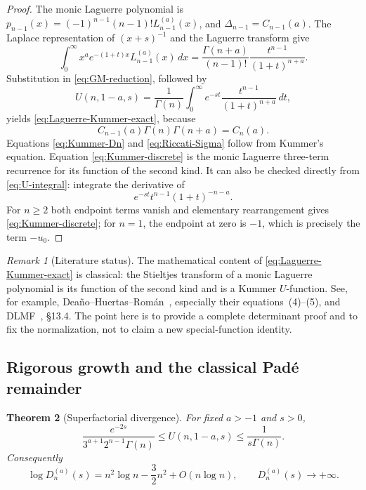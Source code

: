 \documentclass[11pt]{article}
\newtheorem{theorem}{Theorem}[section]
\theoremstyle{definition}
\theoremstyle{remark}
\newtheorem{remark}[theorem]{Remark}
\begin{document}
\begin{proof}
The monic Laguerre polynomial is
\(p_{n-1}(x)=(-1)^{n-1}(n-1)!L_{n-1}^{(a)}(x)\), and
\(\Delta_{n-1}=C_{n-1}(a)\).  The Laplace representation of
\((x+s)^{-1}\) and the Laguerre transform give
\begin{equation}
 \int_0^\infty x^ae^{-(1+t)x}L_{n-1}^{(a)}(x)\,dx
 =\frac{\Gamma(n+a)}{(n-1)!}
   \frac{t^{n-1}}{(1+t)^{n+a}}.
 \label{eq:Laguerre-Laplace}
\end{equation}
Substitution in \eqref{eq:GM-reduction}, followed by
\begin{equation}
 U(n,1-a,s)=\frac1{\Gamma(n)}\int_0^\infty
 e^{-st}\frac{t^{n-1}}{(1+t)^{n+a}}\,dt,
 \label{eq:U-integral}
\end{equation}
yields \eqref{eq:Laguerre-Kummer-exact}, because
\[
 C_{n-1}(a)\Gamma(n)\Gamma(n+a)=C_n(a).
\]
Equations \eqref{eq:Kummer-Dn} and \eqref{eq:Riccati-Sigma} follow from
Kummer's equation.  Equation \eqref{eq:Kummer-discrete} is the monic
Laguerre three-term recurrence for its function of the second kind.  It can
also be checked directly from \eqref{eq:U-integral}: integrate the derivative
of
\[
 e^{-st}t^{n-1}(1+t)^{-n-a}.
\]
For \(n\geq2\) both endpoint terms vanish and elementary rearrangement gives
\eqref{eq:Kummer-discrete}; for \(n=1\), the endpoint at zero is \(-1\), which
is precisely the term \(-u_0\).
\end{proof}

\begin{remark}[Literature status]
The mathematical content of \eqref{eq:Laguerre-Kummer-exact} is classical:
the Stieltjes transform of a monic Laguerre polynomial is its function of the
second kind and is a Kummer \(U\)-function.  See, for example,
Dea\~no--Huertas--Rom\'an~\cite{DeanoHuertasRoman2018}, especially their
equations~(4)--(5), and DLMF~\cite{DLMF}, \S13.4.  The point here is to provide
a complete determinant proof and to fix the normalization, not to claim a new
special-function identity.
\end{remark}

\subsection{Rigorous growth and the classical Pad\'e remainder}

\begin{theorem}[Superfactorial divergence]
\label{thm:Laguerre-divergence}
For fixed \(a>-1\) and \(s>0\),
\begin{equation}
 \frac{e^{-2s}}{3^{a+1}2^{n-1}\Gamma(n)}
 \leq U(n,1-a,s)\leq\frac1{s\Gamma(n)}.
 \label{eq:U-bounds}
\end{equation}
Consequently
\begin{equation}
 \boxed{
 \log D_n^{(a)}(s)=n^2\log n-\frac32n^2+O(n\log n),}
 \qquad
 D_n^{(a)}(s)\longrightarrow+\infty.
 \label{eq:Dn-growth}
\end{equation}
\end{theorem}
\end{document}
